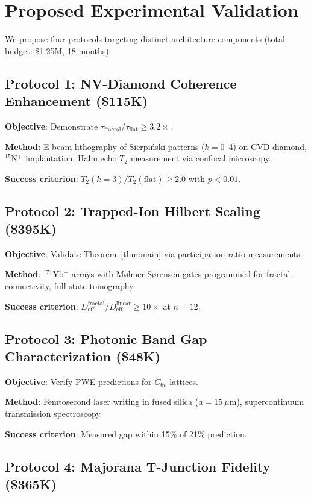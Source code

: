 \documentclass[aps,prx,twocolumn,superscriptaddress,showpacs,showkeys,floatfix]{revtex4-2}
\theoremstyle{plain}
\theoremstyle{definition}
\begin{document}
\section{Proposed Experimental Validation}
\label{sec:experiments}

We propose four protocols targeting distinct architecture components (total budget: \$1.25M, 18 months):

\subsection{Protocol 1: NV-Diamond Coherence Enhancement (\$115K)}

\textbf{Objective}: Demonstrate $\tau_{\mathrm{fractal}}/\tau_{\mathrm{flat}} \geq 3.2\times$.

\textbf{Method}: E-beam lithography of Sierpi\'{n}ski patterns ($k = 0$--4) on CVD diamond, $^{15}$N$^+$ implantation, Hahn echo $T_2$ measurement via confocal microscopy.

\textbf{Success criterion}: $T_2(k=3)/T_2(\mathrm{flat}) \geq 2.0$ with $p < 0.01$.

\subsection{Protocol 2: Trapped-Ion Hilbert Scaling (\$395K)}

\textbf{Objective}: Validate Theorem~\ref{thm:main} via participation ratio measurements.

\textbf{Method}: $^{171}$Yb$^+$ arrays with M{\o}lmer-S{\o}rensen gates programmed for fractal connectivity, full state tomography.

\textbf{Success criterion}: $D_{\mathrm{eff}}^{\mathrm{fractal}}/D_{\mathrm{eff}}^{\mathrm{linear}} \geq 10\times$ at $n = 12$.

\subsection{Protocol 3: Photonic Band Gap Characterization (\$48K)}

\textbf{Objective}: Verify PWE predictions for $C_{6v}$ lattices.

\textbf{Method}: Femtosecond laser writing in fused silica ($a = 15~\mu$m), supercontinuum transmission spectroscopy.

\textbf{Success criterion}: Measured gap within 15\% of 21\% prediction.

\subsection{Protocol 4: Majorana T-Junction Fidelity (\$365K)}
\end{document}
